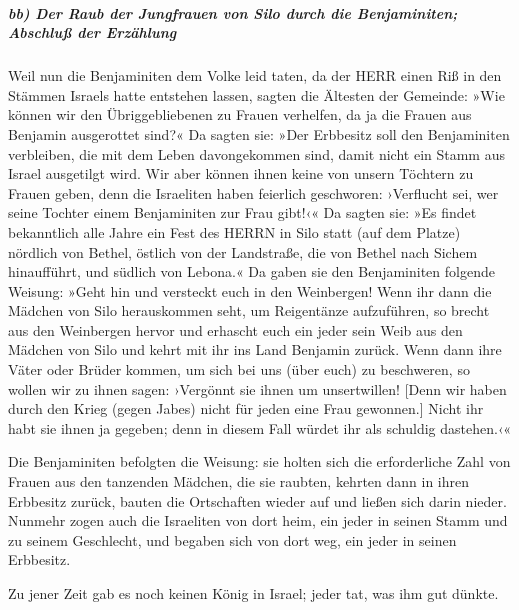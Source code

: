 \hypertarget{bb-der-raub-der-jungfrauen-von-silo-durch-die-benjaminiten-abschluuxdf-der-erzuxe4hlung}{%
\subparagraph{bb) Der Raub der Jungfrauen von Silo durch die
Benjaminiten; Abschluß der
Erzählung}\label{bb-der-raub-der-jungfrauen-von-silo-durch-die-benjaminiten-abschluuxdf-der-erzuxe4hlung}}

Weil nun die Benjaminiten dem Volke leid taten, da der
HERR einen Riß in den Stämmen Israels hatte entstehen lassen,
sagten die Ältesten der Gemeinde: »Wie können wir den
Übriggebliebenen zu Frauen verhelfen, da ja die Frauen aus Benjamin
ausgerottet sind?« Da sagten sie: »Der Erbbesitz soll den
Benjaminiten verbleiben, die mit dem Leben davongekommen sind, damit
nicht ein Stamm aus Israel ausgetilgt wird. Wir aber
können ihnen keine von unsern Töchtern zu Frauen geben, denn die
Israeliten haben feierlich geschworen: ›Verflucht sei, wer seine Tochter
einem Benjaminiten zur Frau gibt!‹« Da sagten sie: »Es
findet bekanntlich alle Jahre ein Fest des HERRN in Silo statt (auf dem
Platze) nördlich von Bethel, östlich von der Landstraße, die von Bethel
nach Sichem hinaufführt, und südlich von Lebona.« Da
gaben sie den Benjaminiten folgende Weisung: »Geht hin und versteckt
euch in den Weinbergen! Wenn ihr dann die Mädchen von
Silo herauskommen seht, um Reigentänze aufzuführen, so brecht aus den
Weinbergen hervor und erhascht euch ein jeder sein Weib aus den Mädchen
von Silo und kehrt mit ihr ins Land Benjamin zurück. Wenn
dann ihre Väter oder Brüder kommen, um sich bei uns (über euch) zu
beschweren, so wollen wir zu ihnen sagen: ›Vergönnt sie ihnen um
unsertwillen! {[}Denn wir haben durch den Krieg (gegen Jabes) nicht für
jeden eine Frau gewonnen.{]} Nicht ihr habt sie ihnen ja gegeben; denn
in diesem Fall würdet ihr als schuldig dastehen.‹«

Die Benjaminiten befolgten die Weisung: sie holten sich
die erforderliche Zahl von Frauen aus den tanzenden Mädchen, die sie
raubten, kehrten dann in ihren Erbbesitz zurück, bauten die Ortschaften
wieder auf und ließen sich darin nieder. Nunmehr zogen
auch die Israeliten von dort heim, ein jeder in seinen Stamm und zu
seinem Geschlecht, und begaben sich von dort weg, ein jeder in seinen
Erbbesitz.

Zu jener Zeit gab es noch keinen König in Israel; jeder
tat, was ihm gut dünkte.
